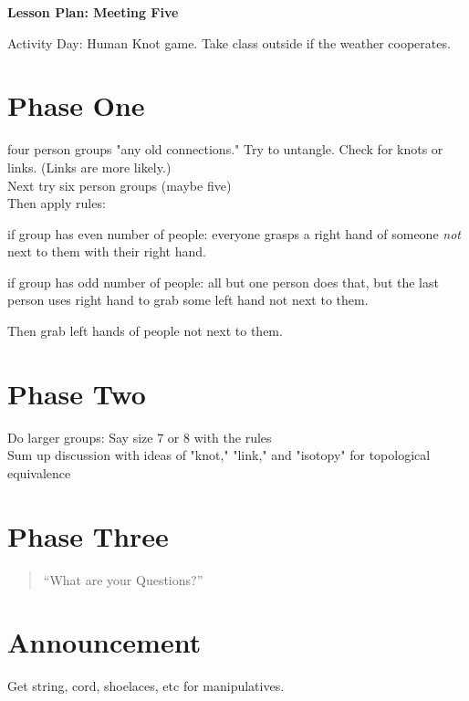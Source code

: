 \documentclass[12pt]{amsart}
\theoremstyle{definition}
\begin{document}
\begin{center}
\textbf{\Huge
Lesson Plan: Meeting Five
}
\end{center}
\vspace{.5in}

Activity Day: Human Knot game. Take class outside if the weather cooperates.

\section*{Phase One}
four person groups "any old connections."
Try to untangle.
Check for knots or links.
(Links are more likely.)\\

Next try six person groups (maybe five)\\

Then apply rules:
\begin{compactitem}
\item if group has even number of people: everyone grasps a right hand of someone \emph{not} next to them with their right hand.
\item if group has odd number of people: all but one person does that, but the last person uses right hand to grab some left hand not next to them.
\item Then grab left hands of people not next to them.
\end{compactitem}

\section*{Phase Two}
Do larger groups: Say size 7 or 8 with the rules \\

Sum up discussion with ideas of "knot," "link," and "isotopy" for topological equivalence

\section*{Phase Three}
\begin{quote}
``What are your Questions?''
\end{quote}

\section*{Announcement}

Get string, cord, shoelaces, etc for manipulatives.
\end{document}

